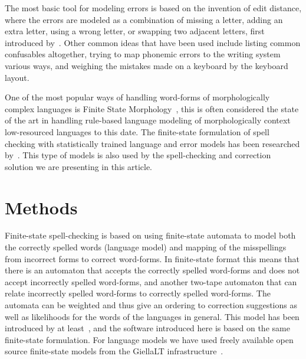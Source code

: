 \documentclass[free]{flammie}
\begin{document}
The most basic tool for modeling errors is based on the invention of edit
distance, where the errors are modeled as a combination of missing a letter,
adding an extra letter, using a wrong letter, or swapping two adjacent letters,
first introduced by~\cite{levenshtein1966binary}.  Other common ideas that have
been used include listing common confusables altogether, trying to map phonemic
errors to the writing system various ways, and weighing the mistakes made on a
keyboard by the keyboard layout.

One of the most popular ways of handling word-forms of morphologically complex
languages is Finite State Morphology~\cite{beesley2003finite}, this is often
considered the state of the art in handling rule-based language modeling of
morphologically context low-resourced languages to this date.  The finite-state
formulation of spell checking with statistically trained language and error
models has been researched by~\cite{pirinen2014state}.  This type of models is
also used by the spell-checking and correction solution we are presenting in
this article.



\section{Methods}

Finite-state spell-checking is based on using finite-state automata to model
both the correctly spelled words (language model) and mapping of the
misspellings from incorrect forms to correct word-forms.  In finite-state format
this means that there is an automaton that accepts the correctly spelled
word-forms and does not accept incorrectly spelled word-forms, and another
two-tape automaton that can relate incorrectly spelled word-forms to correctly
spelled word-forms.  The automata can be weighted and thus give an ordering to
correction suggestions as well as likelihoods for the words of the languages in
general.  This model has been introduced by at least~\cite{pirinen2010finite},
and the software introduced here is based on the same finite-state formulation.
For language models we have used freely available open source finite-state
models from the GiellaLT infrastructure~\cite{pirinen2023giellalt}.
\end{document}
